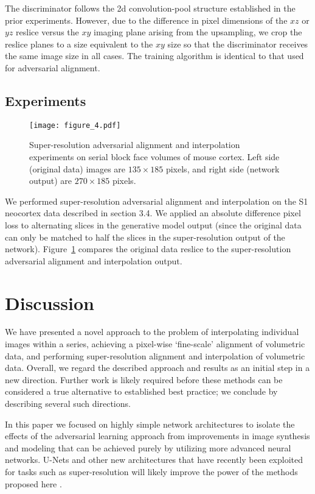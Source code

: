 \documentclass{article} %
\begin{document}
The discriminator follows the 2d convolution-pool structure established in the prior experiments. However, due to the difference in pixel dimensions of the $xz$ or $yz$ reslice versus the $xy$ imaging plane arising from the upsampling, we crop the reslice planes to a size equivalent to the $xy$ size so that the discriminator receives the same image size in all cases. The training algorithm is identical to that used for adversarial alignment. 

\subsection{Experiments}
\begin{figure}
    \centering
    \texttt{[image: figure\_4.pdf]}
    \caption{Super-resolution adversarial alignment and interpolation experiments on serial block face volumes of mouse cortex. Left side (original data) images are $135\times185$ pixels, and right side (network output) are $270\times185$ pixels.}
    \label{fig:experiments_super_resolution_segem}
\end{figure}

We performed super-resolution adversarial alignment and interpolation on the S1 neocortex data described in section 3.4. We applied an absolute difference pixel loss to alternating slices in the generative model output (since the original data can only be matched to half the slices in the super-resolution output of the network). Figure~\ref{fig:experiments_super_resolution_segem} compares the original data reslice to the super-resolution adversarial alignment and interpolation output.  

\section{Discussion}

We have presented a novel approach to the problem of interpolating individual images within a series, achieving a pixel-wise `fine-scale' alignment of volumetric data, and performing super-resolution alignment and interpolation of volumetric data. Overall, we regard the described approach and results as an initial step in a new direction. Further work is likely required before these methods can be considered a true alternative to established best practice; we conclude by describing several such directions.

In this paper we focused on highly simple network architectures to isolate the effects of the adversarial learning approach from improvements in image synthesis and modeling that can be achieved purely by utilizing more advanced neural networks. U-Nets and other new architectures that have recently been exploited for tasks such as super-resolution will likely improve the power of the methods proposed here \cite{heinrich2017deep}.
\end{document}
